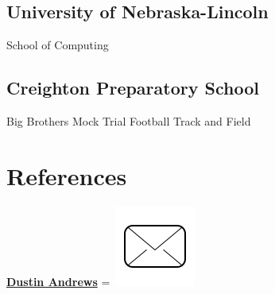 \documentclass[]{latex/resume}
\begin{document}
\begin{minipage}[t]{0.25\textwidth}
    \subsection{University of Nebraska-Lincoln}
    School of Computing \\

    \sectionsep

    \subsection{Creighton Preparatory School} 
    Big Brothers \textbullet{} Mock Trial \textbullet{} Football \textbullet{} Track and Field 
    \\   

    \sectionsep


\section{References}

    \href{https://www.linkedin.com/in/dustin-andrews-4056b232/}{\textbf{Dustin Andrews}} 
    \begingroup
        =\hbox{ \includegraphics[scale=0.1,trim={0 1cm 0cm 0cm}]{latex/icons/mail.png}\hspace{0.1cm}  }
        \parbox{\wd0}{}
    \endgroup
    


\end{minipage}
\end{document}

